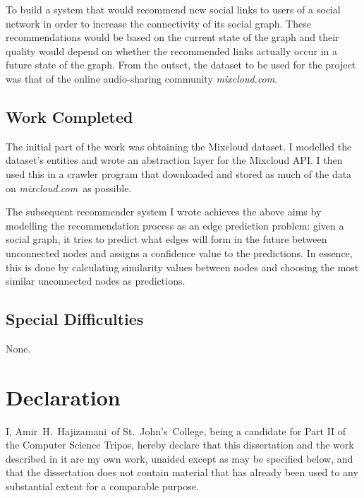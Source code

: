 \documentclass[a4paper,12pt,twoside,notitlepage]{report}
\def\authorname{Amir~H.~Hajizamani}
\def\authorcollege{St.~John's~College}
\def\mixurl{\emph{mixcloud.com}}
\begin{document}
To build a system that would recommend new social links to users of a social
network in order to increase the connectivity of its social graph. These
recommendations would be based on the current state of the graph and their
quality would depend on whether the recommended links actually occur in a
future state of the graph. From the outset, the dataset to be used for the
project was that of the online audio-sharing community \mixurl.

\subsection*{Work Completed}

The initial part of the work was obtaining the Mixcloud dataset. I modelled the
dataset's entities and wrote an abstraction layer for the Mixcloud API. I
then used this in a crawler program that downloaded and stored as much of the
data on \mixurl\ as possible.

The subsequent recommender system I wrote achieves the above aims by modelling
the recommendation process as an edge prediction problem: given a social graph,
it tries to predict what edges will form in the future between unconnected nodes
and assigns a confidence value to the predictions. In essence, this is done by
calculating similarity values between nodes and choosing the most similar
unconnected nodes as predictions.

\subsection*{Special Difficulties}

None.

\newpage

\section*{Declaration}

I, \authorname~of \authorcollege, being a candidate for Part II of the Computer
Science Tripos, hereby declare that this dissertation and the work described in
it are my own work, unaided except as may be specified below, and that
the dissertation does not contain material that has already been used to any
substantial extent for a comparable purpose.

\bigskip
\bigskip
\bigskip
{}
\end{document}
